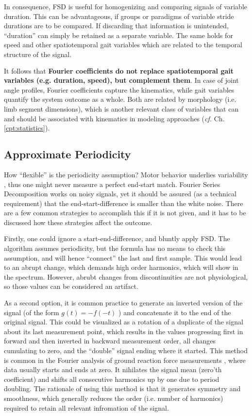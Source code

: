 In consequence, FSD is useful for homogenizing and comparing signals of variable duration.
This can be advantageous, if groups or paradigms of variable stride durations are to be compared.
If discarding that information is unintended, ``duration'' can simply be retained as a separate variable.
The same holds for speed and other spatiotemporal gait variables which are related to the temporal structure of the signal.

It follows that \textbf{Fourier coefficients do not replace spatiotemporal gait variables (e.g. duration, speed), but complement them}.
In case of joint angle profiles, Fourier coefficients capture the kinematics, while gait variables quantify the system outcome as a whole.
Both are related by morphology (i.e. limb segment dimensions), which is another relevant class of variables that can and should be associated with kinematics in modeling approaches (\emph{cf.} Ch. \ref{cpt:statistics}).


\subsection{Approximate Periodicity}
\label{properties:endstart}
How ``flexible'' is the periodicity assumption?
Motor behavior underlies variability \citep{Bernstein1935}, thus one might never measure a perfect end-start match.
Fourier Series Decomposition works on noisy signals, yet it should be assured (as a technical requirement) that the end-start-difference is smaller than the white noise.
There are a few common strategies to accomplish this if it is not given, and it has to be discussed how these strategies affect the outcome.



Firstly, one could ignore a start-end-difference, and bluntly apply FSD.
The algorithm assumes periodicity, but the formula has no means to check this assumption, and will hence ``connect'' the last and first sample.
This would lead to an abrupt change, which demands high order harmonics, which will show in the spectrum.
However, abrubt changes from discontinuities are not physiological, so those values can be considered an artifact.


As a second option, it is common practice to generate an inverted version of the signal (of the form \(g(t) = -f(-t)\) ) and concatenate it to the end of the original signal.
This could be visualized as a rotation of a duplicate of the signal about its last measurement point, which results in the values progressing first in forward and then inverted in backward measurement order, all changes cumulating to zero, and the ``double'' signal ending where it started.
This method is common in the Fourier analysis of ground reaction force measurements \citep{Schneider1983,Alexander1980}, where data usually starts and ends at zero.
It nihilates the signal mean (zero'th coefficient) and shifts all consecutive harmonics up by one due to period doubling.
The rationale of using this method is that it generates symmetry and smoothness, which generally reduces the order (i.e. number of harmonics) required to retain all relevant infromation of the signal.



